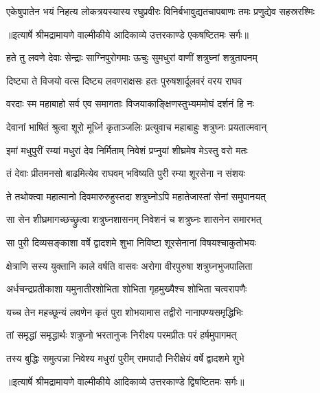 \fourlineindentedshloka
{एकेषुपातेन भयं निहत्य}
{लोकत्रयस्यास्य रघुप्रवीरः}
{विनिर्बभावुद्यतचापबाणः}
{तमः प्रणुद्येव सहस्ररश्मिः} %


{॥इत्यार्षे श्रीमद्रामायणे वाल्मीकीये आदिकाव्ये उत्तरकाण्डे एकषष्टितमः सर्गः॥}


\twolineshloka
{हते तु लवणे देवाः सेन्द्राः साग्निपुरोगमाः}
{ऊचुः सुमधुरां वाणीं शत्रुघ्नां शत्रुतापनम्} %

\twolineshloka
{दिष्ट्या ते विजयो वत्स दिष्ट्य लवणराक्षसः}
{हतः पुरुषशार्दूलवरं वरय राघव} %

\twolineshloka
{वरदाः स्म महाबाहो सर्व एव समागताः}
{विजयाकाङ्क्षिणस्तुभ्यममोघं दर्शनं हि नः} %

\twolineshloka
{देवानां भाषितं श्रुत्वा शूरो मूर्ध्नि कृताञ्जलिः}
{प्रत्युवाच महाबाहुः शत्रुघ्नः प्रयतात्मवान्} %

\twolineshloka
{इमां मधुपुरीं रम्यां मधुरां देव निर्मिताम्}
{निवेशं प्रप्नुयां शीघ्रमेष मेऽस्तु वरो मतः} %

\twolineshloka
{तं देवाः प्रीतमनसो बाढमित्येव राघवम्}
{भविष्यति पुरी रम्या शूरसेना न संशयः} %

\twolineshloka
{ते तथोक्त्वा महात्मानो दिवमारुरुहुस्तदा}
{शत्रुघ्नोऽपि महातेजास्तां सेनां समुपानयत्} %

\twolineshloka
{सा सेन शीघ्रमागच्छच्छ्रुत्वा शत्रुघ्नशासनम्}
{निवेशनं च शत्रुघ्नः शासनेन समारभत्} %

\twolineshloka
{सा पुरी दिव्यसङ्काशा वर्षे द्वादशमे शुभा}
{निविष्टा शूरसेनानां विषयश्चाकुतोभयः} %

\twolineshloka
{क्षेत्राणि सस्य युक्तानि काले वर्षति वासवः}
{अरोगा वीरपुरुषा शत्रुघ्नभुजपालिता} %

\twolineshloka
{अर्धचन्द्रप्रतीकाशा यमुनातीरशोभिता}
{शोभिता गृहमुख्यैश्च शोभिता चत्वरापणैः} %

\twolineshloka
{यच्च तेन महच्छून्यं लवणेन कृतं पुरा}
{शोभयामास तद्वीरो नानापण्यसमृद्धिभिः} %

\twolineshloka
{तां समृद्धां समृद्धार्थः शत्रुघ्नो भरतानुजः}
{निरीक्ष्य परमप्रीतः परं हर्षमुपागमत्} %

\twolineshloka
{तस्य बुद्धिः समुत्पन्ना निवेश्य मधुरां पुरीम्}
{रामपादौ निरीक्षेयं वर्षे द्वादशमे शुभे} %


{॥इत्यार्षे श्रीमद्रामायणे वाल्मीकीये आदिकाव्ये उत्तरकाण्डे द्विषष्टितमः सर्गः॥}

